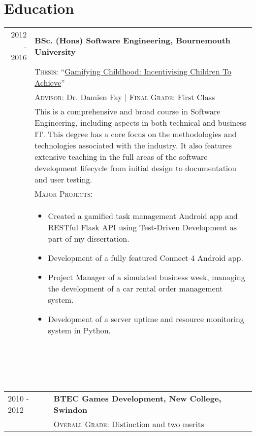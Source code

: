 \section{Education}
\begin{tabular}{r|p{11cm}}
	2012 - 2016 & \textbf{BSc. (Hons) Software Engineering, Bournemouth University}\\ 
	& \textsc{Thesis}: ``\href{https://github.com/mikeporterdev/Dissertation/blob/master/digitalmain.pdf}{Gamifying Childhood: Incentivising Children To Achieve}'' \\
	& \textsc{Advisor}: Dr. Damien Fay | \normalsize \textsc{Final Grade}: First Class \\
	& \small This is a comprehensive and broad course in Software Engineering, including aspects in both technical and business IT. This degree has a core focus on the methodologies and technologies associated with the industry. It also features extensive teaching in the full areas of the software development lifecycle from initial design to documentation and user testing. \\
	& \vspace{1pt} \textsc{Major Projects}: \\
	& \vspace{-0.9em}\begin{itemize}[itemsep=0pt,topsep=0pt,leftmargin=*]\small
	\item Created a gamified task management Android app and RESTful Flask API using Test-Driven Development as part of my dissertation.
	\item Development of a fully featured Connect 4 Android app. 
	\item Project Manager of a simulated business week, managing the development of a car rental order management system.
	\item Development of a server uptime and resource monitoring system in Python.
	\end{itemize}\vspace{-1.5em}

\end{tabular} \\ \\ \\
\begin{tabular}{p{46pt}|p{11cm}}
	\hspace*{\fill}2010 - 2012 & \textbf{BTEC Games Development, New College, Swindon}\\
	\ & \textsc{Overall Grade}: Distinction and two merits
\end{tabular}

